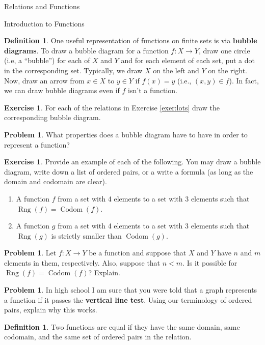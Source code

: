 \documentclass[11pt]{article}
\newcommand{\codom}{\operatorname{Codom}}
\newcommand{\range}{\operatorname{Rng}}
\theoremstyle{definition}
\newtheorem{definition}[theorem]{Definition}
\newtheorem{exercise}[theorem]{Exercise}
\newtheorem{problem}[theorem]{Problem}
\begin{document}
\begin{section}{Relations and Functions}
\begin{subsection}{Introduction to Functions}
\begin{definition}
One useful representation of functions on finite sets is via \textbf{bubble diagrams}.  To draw a bubble diagram for a function $f:X\to Y$, draw one circle (i.e, a ``bubble'') for each of $X$ and $Y$ and for each element of each set, put a dot in the corresponding set.  Typically, we draw $X$ on the left and $Y$ on the right.  Now, draw an arrow from $x\in X$ to $y\in Y$ if $f(x)=y$ (i.e., $(x,y)\in f$).  In fact, we can draw bubble diagrams even if $f$ isn't a function.
\end{definition}

\begin{exercise}
For each of the relations in Exercise \ref{exer:lots} draw the corresponding bubble diagram.
\end{exercise}

\begin{problem}
What properties does a bubble diagram have to have in order to represent a function?
\end{problem}

\begin{exercise}
Provide an example of each of the following.  You may draw a bubble diagram, write down a list of ordered pairs, or a write a formula (as long as the domain and codomain are clear).
\begin{enumerate}
\item A function $f$ from a set with 4 elements to a set with 3 elements such that $\range(f)=\codom(f)$.
\item A function $g$ from a set with 4 elements to a set with 3 elements such that $\range(g)$ is strictly smaller than $\codom(g)$.
\end{enumerate}
\end{exercise}

\begin{problem}
Let $f:X\to Y$ be a function and suppose that $X$ and $Y$ have $n$ and $m$ elements in them, respectively.  Also, suppose that $n<m$.  Is it possible for $\range(f)=\codom(f)$?  Explain.
\end{problem}

\begin{problem}
In high school I am sure that you were told that a graph represents a function if it passes the \textbf{vertical line test}.  Using our terminology of ordered pairs, explain why this works.
\end{problem}

\begin{definition}
Two functions are equal if they have the same domain, same codomain, and the same set of ordered pairs in the relation.
\end{definition}


\end{subsection}
\end{section}
\end{document}
